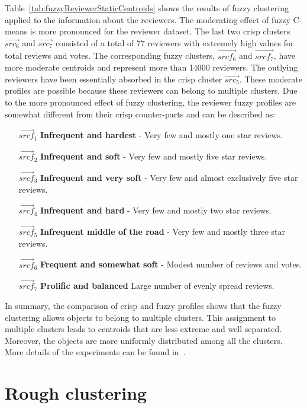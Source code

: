 \documentclass[oribibl]{llncs}
\begin{document}
Table~\ref{tab:fuzzyReviewerStaticCentroids} shows the results of fuzzy clustering applied to the information about the reviewers.
The moderating effect of fuzzy C-means is more pronounced for the reviewer dataset. The last two crisp clusters $\vec{src_6}$ and $\vec{src_7}$
consisted of a total of 77 reviewers with extremely high values for total reviews and votes.
The corresponding fuzzy clusters, $\vec{srcf_6}$ and $\vec{srcf_7}$, have more moderate centroids and represent more than 14000 reviewers.
The outlying reviewers have been essentially absorbed in the crisp cluster $\vec{src_5}$. These moderate profiles are possible because these reviewers
can belong to multiple clusters.
Due to the more pronounced effect of fuzzy clustering, the reviewer fuzzy profiles are somewhat different from their crisp counter-parts and can be described as:

\begin{itemize}
\item [$\vec{srcf}_1$] {\bf Infrequent and hardest} - Very few and mostly one star reviews.
\item [$\vec{srcf}_2$]{\bf Infrequent and soft} - Very few and mostly five star reviews.
\item [$\vec{srcf}_3$] {\bf Infrequent and very soft} - Very few and almost exclusively five star reviews.
\item [$\vec{srcf}_4$] {\bf Infrequent and hard} - Very few and mostly two star reviews.
\item [$\vec{srcf}_5$] {\bf Infrequent middle of the road} - Very few and mostly three star reviews.
\item [$\vec{srcf}_6$] {\bf Frequent and somewhat soft} - Modest number of reviews and votes.
\item [$\vec{srcf}_7$] {\bf Prolific and balanced} Large number of evenly spread reviews.
\end{itemize}

In summary, the comparison of crisp and fuzzy profiles shows that the fuzzy clustering allows objects to belong to multiple clusters. This assignment to multiple clusters leads to centroids that are less extreme and well separated. Moreover, the objects are more uniformly distributed among all the clusters.
More details of the experiments can be found in~\cite{LingrasTriff2015}.

\section{Rough clustering}
\end{document}
